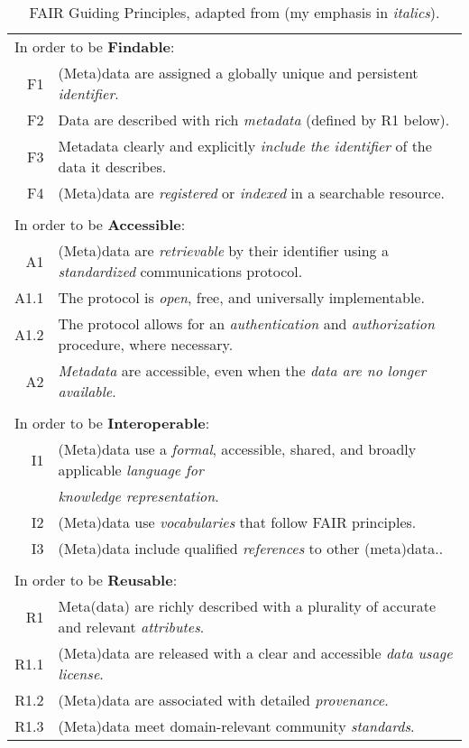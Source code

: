 \begin{table}[htp]
\small
\begin{tabular}{|r l|}
    \hline
    \multicolumn{2}{|l|}{In order to be \textbf{Findable}:} \\
    F1 & (Meta)data are assigned a globally unique and persistent \emph{identifier}. \\
    F2 & Data are described with rich \emph{metadata} (defined by R1 below). \\
    F3 & Metadata clearly and explicitly \emph{include the identifier} of the data it describes. \\
    F4 & (Meta)data are \emph{registered} or \emph{indexed} in a searchable resource. \\
    & \\
     \multicolumn{2}{|l|}{In order to be \textbf{Accessible}:} \\


    A1 & (Meta)data are \emph{retrievable} by their identifier using a 
        \emph{standardized} communications protocol. \\
    A1.1 & The protocol is \emph{open}, free, and universally implementable. \\
    A1.2 & The protocol allows for an \emph{authentication} and  
            \emph{authorization} procedure, where necessary. \\
     A2 & \emph{Metadata} are accessible, even when the \emph{data are no longer available}. \\

     & \\
     \multicolumn{2}{|l|}{In order to be \textbf{Interoperable}:} \\
     I1 & 
     (Meta)data use a \emph{formal}, accessible, shared, and 
         broadly applicable \emph{language for} \\
        &  \emph{knowledge representation}. \\
     I2 & (Meta)data use \emph{vocabularies} that follow FAIR principles. \\
     I3 & (Meta)data include qualified \emph{references} to other (meta)data.. \\

     & \\
     \multicolumn{2}{|l|}{In order to be \textbf{Reusable}:} \\
     R1 & Meta(data) are richly described with a plurality of 
         accurate and relevant \emph{attributes}. \\
            R1.1 & (Meta)data are released with a clear and accessible \emph{data usage license}. \\
            R1.2 & (Meta)data are associated with detailed \emph{provenance}. \\
            R1.3 & (Meta)data meet domain-relevant community \emph{standards}. \\
    \hline

\end{tabular}
\caption{FAIR Guiding Principles, adapted from \cite{Wilkinson 2016} (my emphasis in \emph{italics}).}
\label{ch10:fair}
\end{table}

